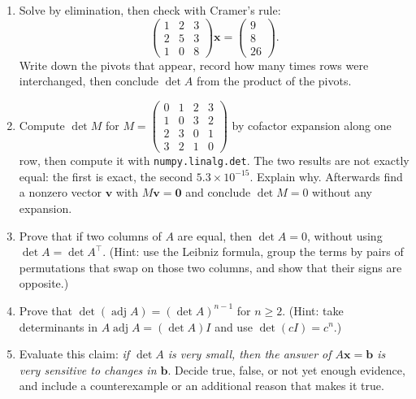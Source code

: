 \begin{latihan}
\begin{enumerate}
  \item Solve by elimination, then check with Cramer's rule:
        \[
          \begin{pmatrix}1&2&3\\ 2&5&3\\ 1&0&8\end{pmatrix}\mathbf{x}
          =\begin{pmatrix}9\\ 8\\ 26\end{pmatrix}.
        \]
        Write down the pivots that appear, record how many times rows were interchanged, then
        conclude $\det A$ from the product of the pivots.

  \item Compute $\det M$ for
        $M=\begin{pmatrix}0&1&2&3\\ 1&0&3&2\\ 2&3&0&1\\ 3&2&1&0\end{pmatrix}$
        by cofactor expansion along one row, then compute it with
        \texttt{numpy.linalg.det}. The two results are not exactly equal: the first is exact, the
        second $5.3\times10^{-15}$. Explain why. Afterwards find a nonzero vector
        $\mathbf{v}$ with $M\mathbf{v}=\mathbf{0}$ and conclude $\det M=0$ without any
        expansion.

  \item Prove that if two columns of $A$ are equal, then $\det A=0$, without using
        $\det A=\det A^{\top}$.
        (Hint: use the Leibniz formula, group the terms by pairs of permutations that swap on
        those two columns, and show that their signs are opposite.)

  \item Prove that $\det(\operatorname{adj}A)=(\det A)^{n-1}$ for $n\ge2$.
        (Hint: take determinants in $A\operatorname{adj}A=(\det A)I$ and use
        $\det(cI)=c^{n}$.)

  \item Evaluate this claim: \emph{if $\det A$ is very small, then the answer of $A\mathbf{x}
        =\mathbf{b}$ is very sensitive to changes in $\mathbf{b}$}. Decide true, false, or not
        yet enough evidence, and include a counterexample or an additional reason that makes it
        true.


\end{enumerate}
\end{latihan}
